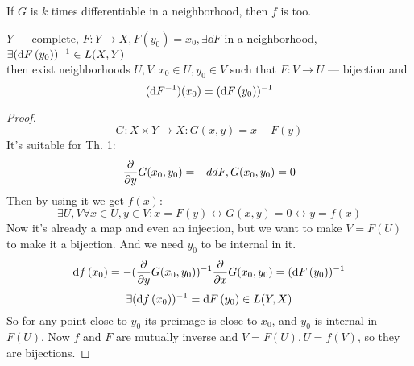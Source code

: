 \begin{thr}[Corollary] 
    If $G$ is $k$ times differentiable in a neighborhood, then $f$ is too.
\end{thr}

\begin{thr}
    $Y$ --- complete, $F: Y \to X, F(y_0) = x_0, \exists \dd{F}$ in a neighborhood, $\exists (\dd{F}\/(y_0))^{-1} \in L(X, Y)$ \\ 
    then exist neighborhoods $U, V: x_0 \in U, y_0 \in V$ such that $F: V \to U$ --- bijection and
    \[ (\dd{F^{-1}})(x_0) = (\dd{F}\/(y_0))^{-1} \]  
\end{thr}
\begin{proof}
    \[ G: X \times Y \to X: G(x, y) = x - F(y) \]
    It's suitable for Th. 1:
    \[ \pdv{y} G\/(x_0, y_0) = -dd{F}, G(x_0, y_0) = 0 \]
    Then by using it we get $f(x)$:
    \[ \exists U, V \forall x \in U, y \in V : x = F(y) \leftrightarrow G(x, y) = 0 \leftrightarrow y = f(x) \]
    Now it's already a map and even an injection, but we want to make $V = F(U)$ to make it a bijection. And we need $y_0$ to be internal in it.
    \[ \dd{f}\/(x_0) = -(\pdv{y} G(x_0, y_0))^{-1} \pdv{x}\/G(x_0, y_0) = (\dd{F}\/(y_0))^{-1} \]
    \[ \exists (\dd{f}\/(x_0))^{-1} = \dd{F}\/(y_0) \in L(Y, X) \] 
    So for any point close to $y_0$ its preimage is close to $x_0$, and $y_0$ is internal in $F(U)$.
    Now $f$ and $F$ are mutually inverse and $V = F(U), U = f(V)$, so they are bijections.
\end{proof}

